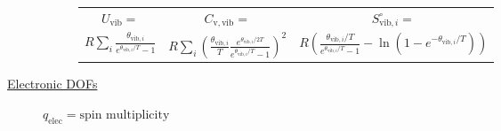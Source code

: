 \documentclass[11pt]{article}
\begin{document}
\begin{outline}
\begin{table}
\begin{center}
\begin{description}
\begin{description}
\begin{tabular}{ccc}
$ U_\mathrm{vib}= $ & $  C_\mathrm{v,vib} = $ & $S^\circ_{\mathrm{vib},i}=$ \\
$\displaystyle
R\sum_i\frac{\theta_{\mathrm{vib},i}}{e^{\theta_{\mathrm{vib},i}/T}-1}$ &
$\displaystyle R \sum_i \left (
  \frac{\theta_{\mathrm{vib},i}}{T}\frac{e^{\theta_{\mathrm{vib},i}/2T}}{e^{\theta_{\mathrm{vib},i}/T}-1}
\right )^2 $ & $\displaystyle R \left ( \frac{\theta_{\mathrm{vib},i}/T}{e^{\theta_{\mathrm{vib},i}/T}-1}
-\ln(1-e^{-\theta_{\mathrm{vib},i}/T})\right ) $ \\
\end{tabular}

\end{description}
\item[\underline{Electronic DOFs}] {}
$q_\mathrm{elec} = \text{spin multiplicity}$


\end{description}
\end{center}
\end{table}



\end{outline}
\end{document}
